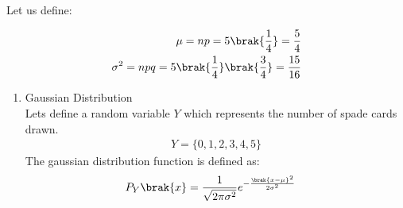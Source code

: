 \documentclass[journal,12pt,twocolumn]{IEEEtran}
\theoremstyle{remark}
\begin{document}
\solution
Let us define:
\begin{table}[!ht]

\end{table}
\begin{align}
\mu = np = 5\brak{\frac{1}{4}} = \frac{5}{4}\\
{\sigma}^2 = npq = 5\brak{\frac{1}{4}}\brak{\frac{3}{4}} = \frac{15}{16}	
\end{align}
\begin{enumerate}[label=(\roman*)]
\item {Gaussian Distribution}\\
Lets define a random variable $Y$ which represents the number of spade cards drawn.
\begin{align}
Y = \{0,1,2,3,4,5\}
\end{align}
The gaussian distribution function is defined as:
\begin{align}
P_Y\brak{x} &= \frac{1}{\sqrt{2\pi{\sigma}^2}} e^{-\frac{\brak{x-\mu}^2}{2{\sigma}^2}} 
\end{align}


\end{enumerate}
\end{document}
